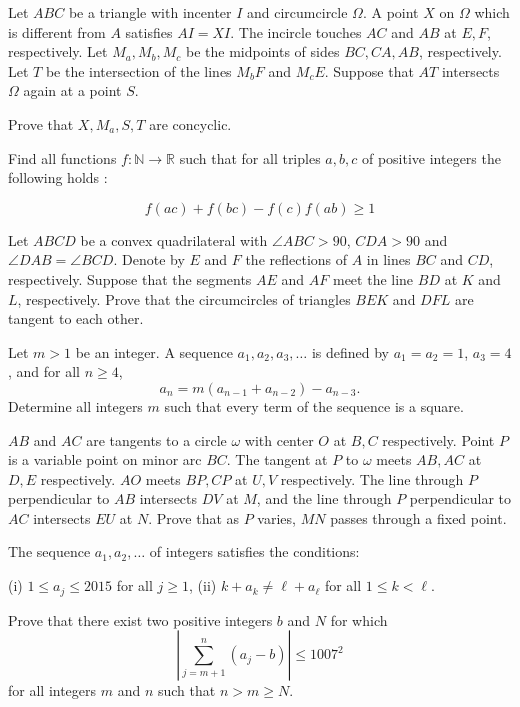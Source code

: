 \documentclass[11pt]{scrartcl}
\begin{document}
\begin{problem}[727078403801409]
Let $ABC$ be a triangle with incenter $I$ and circumcircle $\Omega$. A point $X$ on $\Omega$ which is different from $A$ satisfies $AI=XI$. The incircle touches $AC$ and $AB$ at $E, F$, respectively. Let $M_a, M_b, M_c$ be the midpoints of sides $BC, CA, AB$, respectively. Let $T$ be the intersection of the lines $M_bF$ and $M_cE$. Suppose that $AT$ intersects $\Omega$ again at a point $S$.

Prove that $X, M_a, S, T$ are concyclic.
\end{problem}
\begin{problem}[727980795827392]
Find all functions $f : \mathbb{N} \rightarrow \mathbb{R}$ such that for all triples $a,b,c$ of positive integers the following holds :

$$f(ac)+f(bc)-f(c)f(ab) \ge 1$$
\end{problem}
\begin{problem}[728988632553727]
Let $ABCD$ be a convex quadrilateral with $\angle ABC>90$, $CDA>90$ and $\angle DAB=\angle BCD$. Denote by $E$ and $F$ the reflections of $A$ in lines $BC$ and $CD$, respectively. Suppose that the segments $AE$ and $AF$ meet the line $BD$ at $K$ and $L$, respectively. Prove that the circumcircles of triangles $BEK$ and $DFL$ are tangent to each other.
\end{problem}
\begin{problem}[732021656607287]
Let $m > 1$ be an integer. A sequence $a_1, a_2, a_3, \ldots$ is defined by $a_1 = a_2 = 1$, $a_3 = 4$, and for all $n \ge 4$,$$a_n = m(a_{n - 1} + a_{n - 2}) - a_{n - 3}.$$
Determine all integers $m$ such that every term of the sequence is a square.
\end{problem}
\begin{problem}[733773583946080]
$AB$ and $AC$ are tangents to a circle $\omega$ with center $O$ at $B,C$ respectively. Point $P$ is a variable point on minor arc $BC$. The tangent at $P$ to $\omega$ meets $AB,AC$ at $D,E$ respectively. $AO$ meets $BP,CP$ at $U,V$ respectively. The line through $P$ perpendicular to $AB$ intersects $DV$ at $M$, and the line through $P$ perpendicular to $AC$ intersects $EU$ at $N$. Prove that as $P$ varies, $MN$ passes through a fixed point.
\end{problem}
\begin{problem}[736279317663030]
The sequence $a_1,a_2,\dots$ of integers satisfies the conditions:

(i) $1\le a_j\le2015$ for all $j\ge1$,
(ii) $k+a_k\neq \ell+a_\ell$ for all $1\le k<\ell$.

Prove that there exist two positive integers $b$ and $N$ for which\[\left\vert\sum_{j=m+1}^n(a_j-b)\right\vert\le1007^2\]for all integers $m$ and $n$ such that $n>m\ge N$.
\end{problem}
\end{document}
